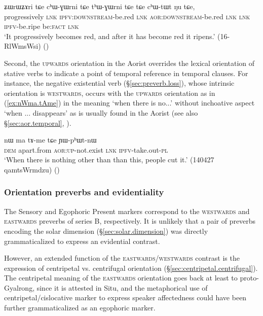 \begin{exe}
\ex \label{ex:chWGWrni}
\gll ʑɯrɯʑɤri tɕe cʰɯ-ɣɯrni tɕe tʰɯ-ɣɯrni tɕe tɕe cʰɯ-tɯt ŋu tɕe,  \\
progressively \textsc{lnk} \textsc{ipfv}:\textsc{downstream}-be.red \textsc{lnk} \textsc{aor}:\textsc{downstream}-be.red \textsc{lnk} \textsc{lnk} \textsc{ipfv}-be.ripe be:\textsc{fact} \textsc{lnk}  \\
\glt `It progressively becomes red, and after it has become red it ripens.' (16-RlWmsWsi) ()
\end{exe}
 
Second, the \textsc{upwards} orientation in the Aorist overrides the lexical orientation of stative verbs to indicate a point of temporal reference in temporal clauses. For instance, the negative existential verb  (§\ref{sec:preverb.loss}), whose intrinsic orientation is \textsc{westwards}, occurs with the \textsc{upwards} orientation as in (\ref{ex:nWma.tAme}) in the meaning `when there is no...' without inchoative aspect `when ... disappears' as is usually found in the Aorist (see also §\ref{sec:aor.temporal}, \citealt[283, fn 10]{jacques14linking}).

\begin{exe}
\ex \label{ex:nWma.tAme}
\gll  nɯ ma tɤ-me tɕe ɲɯ-pʰɯt-nɯ  \\
\textsc{dem} apart.from \textsc{aor}:\textsc{up}-not.exist \textsc{lnk}  \textsc{ipfv}-take.out-\textsc{pl}   \\
\glt `When there is nothing other than than this, people cut it.' (140427 qamtsWrmdzu)
()
\end{exe} 

\subsubsection{Orientation preverbs and evidentiality} \label{sec:orientation.preverb.evd}
The Sensory  and Egophoric Present  markers correspond to the \textsc{westwards} and \textsc{eastwards} preverbs of series B, respectively. It is unlikely that a pair of preverbs encoding the solar dimension (§\ref{sec:solar.dimension}) was directly grammaticalized to express an evidential contrast.

However, an extended function of the \textsc{eastwards}/\textsc{westwards} contrast is the expression of centripetal vs. centrifugal orientation (§\ref{sec:centripetal.centrifugal}). The centripetal meaning of the \textsc{eastwards} orientation goes back at least to proto-Gyalrong, since it is attested in Situ, and the metaphorical use of centripetal/cislocative marker to express speaker affectedness could have been further grammaticalized as an egophoric marker. 

